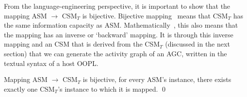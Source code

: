 From the language-engineering perspective, it is important to show that the mapping ASM $ \rightarrow $ CSM$_T$ is bijective. Bijective mapping~\cite{stevens_landscape_2008} means that CSM$_T$ has the same information capacity as ASM. Mathematically~\cite{weisstein_bijective_2018}, this also means that the mapping has an inverse or `backward' mapping. It is through this inverse mapping and an CSM that is derived from the CSM$_T$ (discussed in the next section) that we can generate the activity graph of an AGC, written in the textual syntax of a host OOPL.
%
\begin{theorem} \label{thm:mapping-cm2cmt}
Mapping ASM $\rightarrow$ CSM$_T$ is bijective, \ie for every ASM's instance, there exists exactly one CSM$_T$'s instance to which it is mapped. \qed 
\end{theorem}

